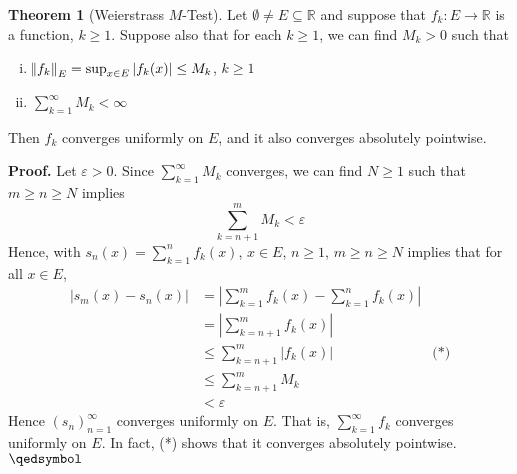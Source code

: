 \documentclass[11pt]{article}
\theoremstyle{definition}
\newtheorem{thm}{Theorem}[section]
\newcommand{\mbR}{\ensuremath{\mathbb{R}}}
\begin{document}
\begin{thm}[Weierstrass $M$-Test]
Let $\emptyset \ne E \subseteq \mbR$ and suppose that $f_k : E \to \mbR$ is a function, $k \geq 1$. Suppose also that for each $k \geq 1$, we can find $M_k > 0$ such that
\begin{enumerate}[(i)] \vspace{-0.2cm}
\item $\norm{f_k}_E = \sup_{x \in E} |f_k(x)| \leq M_k$, $k \geq 1$
\item $\sum_{k=1}^\infty M_k < \infty$
\end{enumerate}
Then $f_k$ converges uniformly on $E$, and it also converges absolutely pointwise.
\end{thm}
\textbf{Proof.} Let $\varepsilon > 0$. Since $\sum_{k=1}^\infty M_k$ converges, we can find $N \geq 1$ such that $m \geq n \geq N$ implies
$$\sum_{k=n+1}^m M_k < \varepsilon$$
Hence, with $s_n(x) = \sum_{k=1}^n f_k(x)$, $x \in E$, $n \geq 1$, $m \geq n \geq N$ implies that for all $x \in E$,
\begin{align*}
|s_m(x) - s_n(x)| & = \left| \sum_{k=1}^m f_k(x) - \sum_{k=1}^n f_k(x) \right| \\
& = \left| \sum_{k=n+1}^m f_k(x) \right| \\
& \leq \sum_{k=n+1}^m |f_k(x)| & \text{(*)} \\
& \leq \sum_{k=n+1}^m M_k \\
& < \varepsilon
\end{align*}
Hence $(s_n)_{n=1}^\infty$ converges uniformly on $E$. That is, $\sum_{k=1}^\infty f_k$ converges uniformly on $E$.
In fact, (*) shows that it converges absolutely pointwise. $\qedsymbol$
\end{document}
